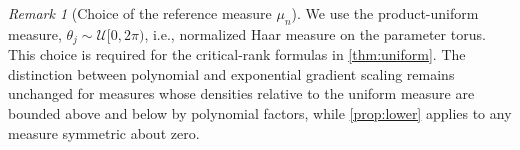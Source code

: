 \documentclass{article}
\theoremstyle{plain}
\theoremstyle{definition}
\theoremstyle{remark}
\newtheorem{remark}[theorem]{Remark}
\begin{document}
\begin{remark}[Choice of the reference measure $\mu_n$]
We use the product-uniform measure, $\theta_j\sim\mathcal U[0,2\pi)$, i.e., normalized Haar measure on the parameter torus. This choice is required for the critical-rank formulas in \cref{thm:uniform}. The distinction between polynomial and exponential gradient scaling remains unchanged for measures whose densities relative to the uniform measure are bounded above and below by polynomial factors, while \cref{prop:lower} applies to any measure symmetric about zero.
\end{remark}
\end{document}

